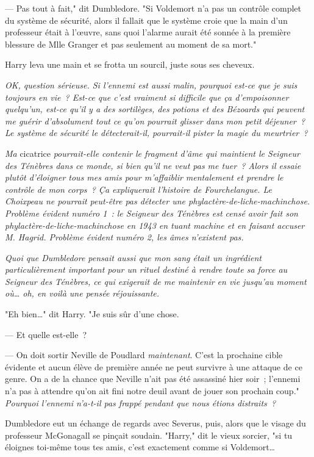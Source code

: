 --- Pas tout à fait," dit Dumbledore. "Si Voldemort n'a pas un contrôle complet du système de sécurité, alors il fallait que le système croie que la main d'un professeur était à l'œuvre, sans quoi l'alarme aurait été sonnée à la première blessure de Mlle Granger et pas seulement au moment de sa mort."

Harry leva une main et se frotta un sourcil, juste sous ses cheveux.

\emph{OK, question sérieuse. Si l'ennemi est aussi malin, pourquoi est-ce que je suis toujours en vie~? Est-ce que c'est vraiment si difficile que ça d'empoisonner quelqu'un, est-ce qu'il y a des sortilèges, des potions et des Bézoards qui peuvent me guérir d'absolument tout ce qu'on pourrait glisser dans mon petit déjeuner~? Le système de sécurité le détecterait-il, pourrait-il pister la magie du meurtrier~?}

\emph{Ma} cicatrice \emph{pourrait-elle contenir le fragment d'âme qui maintient le Seigneur des Ténèbres dans ce monde, si bien qu'il ne veut pas me tuer~? Alors il essaie plutôt d'éloigner tous mes amis pour m'affaiblir mentalement et prendre le contrôle de mon corps~? Ça expliquerait l'histoire de Fourchelangue. Le Choixpeau ne pourrait peut-être pas détecter une phylactère-de-liche-machinchose. Problème évident numéro 1~: le Seigneur des Ténèbres est censé avoir fait son phylactère-de-liche-machinchose en 1943 en tuant machine et en faisant accuser M. Hagrid. Problème évident numéro 2, les âmes n'existent pas.}

\emph{Quoi que Dumbledore pensait aussi que mon sang était un ingrédient particulièrement important pour un rituel destiné à rendre toute sa force au Seigneur des Ténèbres, ce qui exigerait de me maintenir en vie jusqu'au moment où… oh, en voilà une pensée réjouissante.}

"Eh bien…" dit Harry. "Je suis sûr d'une chose.

--- Et quelle est-elle~?

--- On doit sortir Neville de Poudlard \emph{maintenant}. C'est la prochaine cible évidente et aucun élève de première année ne peut survivre à une attaque de ce genre. On a de la chance que Neville n'ait pas été assassiné hier soir~; l'ennemi n'a pas à attendre qu'on ait fini notre deuil avant de jouer son prochain coup." \emph{Pourquoi l'ennemi n'a-t-il pas frappé pendant que nous étions distraits~?}

Dumbledore eut un échange de regards avec Severus, puis, alors que le visage du professeur McGonagall se pinçait soudain. "Harry," dit le vieux sorcier, "si tu éloignes toi-même tous tes amis, c'est exactement comme si Voldemort…

